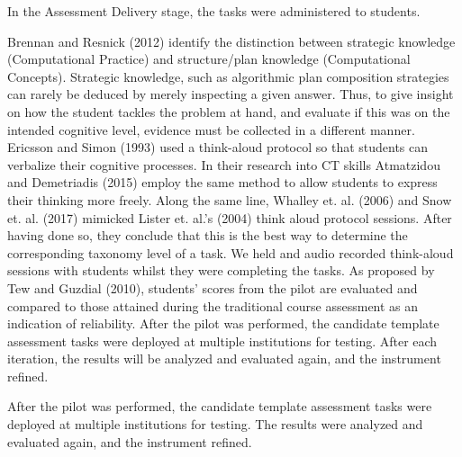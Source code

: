 In the Assessment Delivery stage, the tasks were administered to students.



Brennan and Resnick (2012) identify the distinction between strategic knowledge (Computational Practice) and structure/plan knowledge (Computational Concepts). Strategic knowledge, such as algorithmic plan composition strategies can rarely be deduced by merely inspecting a given answer. Thus, to give insight on how the student tackles the problem at hand, and evaluate if this was on the intended cognitive level, evidence must be collected in a different manner.  Ericsson and Simon (1993) used a think-aloud protocol so that students can verbalize their cognitive processes. In their research into CT skills Atmatzidou and Demetriadis (2015) employ the same method to allow students to express their thinking more freely. Along the same line, Whalley et. al. (2006) and Snow et. al. (2017) mimicked Lister et. al.'s (2004) think aloud protocol sessions. After having done so, they conclude that this is the best way to determine the corresponding taxonomy level of a task. We held and audio recorded think-aloud sessions with students whilst they were completing the tasks. As proposed by Tew and Guzdial (2010), students' scores from the pilot are evaluated and compared to those attained during the traditional course assessment as an indication of reliability. After the pilot was performed, the candidate template assessment tasks were deployed at multiple institutions for testing. After each iteration, the results will be analyzed and evaluated again, and the instrument refined.

After the pilot was performed, the  candidate template assessment tasks were deployed at multiple institutions for testing. The results were analyzed and evaluated again, and the instrument refined.

